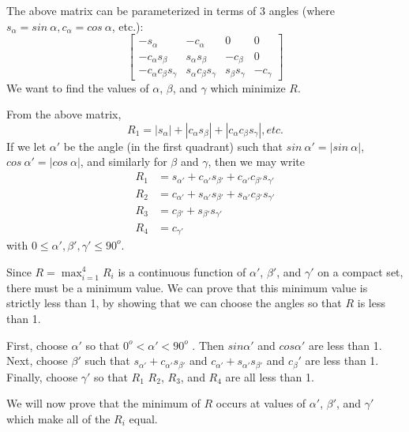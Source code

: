 The above matrix can be parameterized in terms of 3 angles (where
\label{refpage4}
$s_\alpha = sin~\alpha, c_\alpha = cos~\alpha$, etc.):
\begin{equation*}
\begin{bmatrix}
-s_\alpha                  & -c_\alpha                  &  0                & 0        \\
-c_\alpha s_\beta          &  s_\alpha s_\beta          & -c_\beta &        0          \\
-c_\alpha c_\beta s_\gamma &  s_\alpha c_\beta s_\gamma &  s_\beta s_\gamma & -c_\gamma
\end{bmatrix}
\end{equation*}
We want to find the values of $\alpha$, $\beta$, and $\gamma$ which
minimize $R$.

From the above matrix,
\begin{equation*}
R_1 = | s_\alpha | + | c_\alpha s_\beta | + | c_\alpha c_\beta s_\gamma |, etc.
\end{equation*}
If we let $\alpha'$ be the angle (in the first quadrant) such that
$sin~\alpha' = | sin~\alpha |$, $cos~\alpha' = | cos~\alpha |$, and
similarly for $\beta$ and $\gamma$, then we may write
\begin{align*}
R_1 & = s_{\alpha'} + c_{\alpha'} s_{\beta'} + c_{\alpha'} c_{\beta'} s_{\gamma'} \\
R_2 & = c_{\alpha'} + s_{\alpha'} s_{\beta'} + s_{\alpha'} c_{\beta'} s_{\gamma'} \\
R_3 & = c_{\beta'} + s_{\beta'} s_{\gamma'} \\
R_4 & = c_{\gamma'}
\end{align*}
with $0 \leq \alpha',\beta',\gamma' \leq 90^o$.

Since $R = \max_{i=1}^{4} R_i$ is a continuous function of $\alpha'$,
\label{refpage3}
$\beta'$, and $\gamma'$ on a compact set, there must be a minimum value.
We can prove that this minimum value is strictly less than 1, by showing
\label{refpage29}
that we can choose the angles so that $R$ is less than 1.

First, choose $\alpha'$ so that $0^o < \alpha' < 90^o$ . Then $sin\alpha'$
and $cos\alpha'$ are less than 1.  Next, choose $\beta'$ such that
$s_{\alpha'} + c_{\alpha'} s_{\beta'}$ and
$c_{\alpha'} + s_{\alpha'} s_{\beta'}$ and
$c_{\beta}'$ are less than 1. Finally, choose $\gamma'$ so that
$R_1$ $R_2$, $R_3$, and $R_4$ are all less than 1.

We will now prove that the minimum of $R$ occurs at values of $\alpha'$,
$\beta'$, and $\gamma'$ which make all of the $R_i$ equal.


